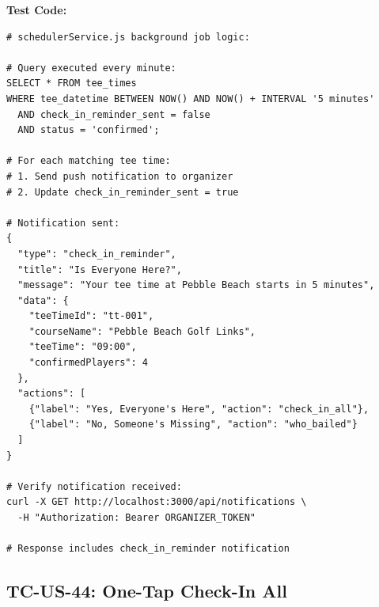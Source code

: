 \documentclass[11pt,a4paper]{article}
\begin{document}
\vspace{0.3cm}
\textbf{Test Code:}
\begin{lstlisting}
# schedulerService.js background job logic:

# Query executed every minute:
SELECT * FROM tee_times 
WHERE tee_datetime BETWEEN NOW() AND NOW() + INTERVAL '5 minutes'
  AND check_in_reminder_sent = false
  AND status = 'confirmed';

# For each matching tee time:
# 1. Send push notification to organizer
# 2. Update check_in_reminder_sent = true

# Notification sent:
{
  "type": "check_in_reminder",
  "title": "Is Everyone Here?",
  "message": "Your tee time at Pebble Beach starts in 5 minutes",
  "data": {
    "teeTimeId": "tt-001",
    "courseName": "Pebble Beach Golf Links",
    "teeTime": "09:00",
    "confirmedPlayers": 4
  },
  "actions": [
    {"label": "Yes, Everyone's Here", "action": "check_in_all"},
    {"label": "No, Someone's Missing", "action": "who_bailed"}
  ]
}

# Verify notification received:
curl -X GET http://localhost:3000/api/notifications \
  -H "Authorization: Bearer ORGANIZER_TOKEN"

# Response includes check_in_reminder notification
\end{lstlisting}

\vspace{0.5cm}


\subsection{TC-US-44: One-Tap Check-In All}
\end{document}
